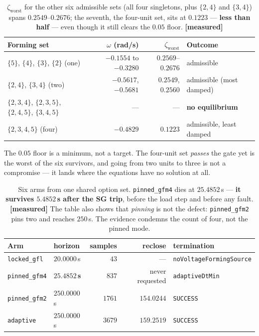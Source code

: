 \documentclass[11pt,a4paper]{article}
\newcommand{\code}[1]{\texttt{\small #1}}
\newcommand{\zworst}{\zeta_{\mathrm{worst}}}
\newcommand{\mes}{\textcolor{ok}{\textbf{[measured]}}}
\begin{document}
\begin{table}[H]
\centering\small
\begin{tabular}{@{}lrrl@{}}
\toprule
\textbf{Forming set} & $\omega$ (rad/s) & $\zworst$ & \textbf{Outcome}\\
\midrule
$\{5\}$, $\{4\}$, $\{3\}$, $\{2\}$ (one) & $-0.1554$ to $-0.3280$ & $0.2569$--$0.2676$ & admissible\\
$\{2,4\}$, $\{3,4\}$ (two) & $-0.5617$, $\mathbf{-0.5681}$ & $0.2549$, $0.2560$ & admissible (most damped)\\
$\{2,3,4\}$, $\{2,3,5\}$, $\{2,4,5\}$, $\{3,4,5\}$ & --- & --- & \textcolor{no}{\textbf{no equilibrium}}\\
$\{2,3,4,5\}$ (four) & $-0.4829$ & \textcolor{no}{$\mathbf{0.1223}$} & admissible, least damped\\
\bottomrule
\end{tabular}
\caption{$\zworst$ for the other six admissible sets (all four singletons, plus
$\{2,4\}$ and $\{3,4\}$) spans $0.2549$--$0.2676$; the seventh, the four-unit
set, sits at $\mathbf{0.1223}$ --- \textbf{less than half} --- even though it
still clears the $0.05$ floor. \mes}
\end{table}

\noindent
The $0.05$ floor is a minimum, not a target. The four-unit set \emph{passes} the
gate yet is the worst of the six survivors, and going from two units to three is
not a compromise --- it lands where the equations have no solution at all.

\begin{table}[H]
\centering\small
\begin{tabular}{@{}llrrl@{}}
\toprule
\textbf{Arm} & \textbf{horizon} & \textbf{samples} & \textbf{reclose} & \textbf{termination}\\
\midrule
\code{locked\_gfl}  & $20.0000$\,s & $43$   & ---        & \code{noVoltageFormingSource}\\
\code{pinned\_gfm4} & \textcolor{no}{$\mathbf{25.4852}$\,\textbf{s}} & $837$ & never requested & \code{adaptiveDtMin}\\
\code{pinned\_gfm2} & $250.0000$\,s & $1761$ & $154.0244$ & \code{SUCCESS}\\
\code{adaptive}     & $250.0000$\,s & $3679$ & $159.2519$ & \code{SUCCESS}\\
\bottomrule
\end{tabular}
\caption{Six arms from one shared option set. \code{pinned\_gfm4} dies at
$25.4852$\,s --- \textbf{it survives $5.4852$\,s after the SG trip}, before the
load step and before any fault. \mes{} The table also shows that \emph{pinning}
is not the defect: \code{pinned\_gfm2} pins two and reaches $250$\,s. The
evidence condemns the count of four, not the pinned mode.}
\end{table}
\end{document}
